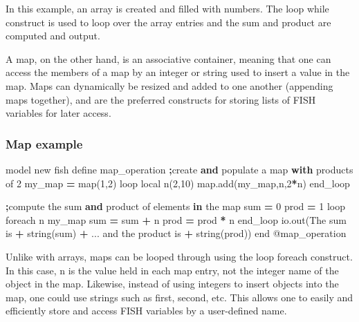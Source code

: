 \documentclass[a4paper, nobind]{templates/ociamthesis}
\newenvironment{Shaded}{\begin{snugshade}}{\end{snugshade}}
\newcommand{\AttributeTok}[1]{\textcolor[rgb]{0.77,0.63,0.00}{#1}}
\newcommand{\BuiltInTok}[1]{#1}
\newcommand{\ControlFlowTok}[1]{\textcolor[rgb]{0.13,0.29,0.53}{\textbf{#1}}}
\newcommand{\DecValTok}[1]{\textcolor[rgb]{0.00,0.00,0.81}{#1}}
\newcommand{\KeywordTok}[1]{\textcolor[rgb]{0.13,0.29,0.53}{\textbf{#1}}}
\newcommand{\NormalTok}[1]{#1}
\newcommand{\OperatorTok}[1]{\textcolor[rgb]{0.81,0.36,0.00}{\textbf{#1}}}
\newcommand{\StringTok}[1]{\textcolor[rgb]{0.31,0.60,0.02}{#1}}
\renewenvironment{Shaded}
{
  \vspace{10pt}%
  \begin{snugshade}%
}{%
  \end{snugshade}%
  \vspace{8pt}%
}
\begin{document}
In this example, an array is created and filled with numbers. The loop while construct is used to loop over the array entries and the sum and product are computed and output.

A map, on the other hand, is an associative container, meaning that one can access the members of a map by an integer or string used to insert a value in the map. Maps can dynamically be resized and added to one another (appending maps together), and are the preferred constructs for storing lists of FISH variables for later access.

\hypertarget{map-example}{%
\subsubsection{Map example}\label{map-example}}

\begin{Shaded}
\begin{Highlighting}[]
\NormalTok{model new}
\NormalTok{fish define map\_operation}
    \OperatorTok{;}\NormalTok{create }\KeywordTok{and}\NormalTok{ populate a }\BuiltInTok{map} \ControlFlowTok{with}\NormalTok{ products of }\DecValTok{2}
\NormalTok{    my\_map }\OperatorTok{=} \BuiltInTok{map}\NormalTok{(}\DecValTok{1}\NormalTok{,}\DecValTok{2}\NormalTok{)}
\NormalTok{    loop local n(}\DecValTok{2}\NormalTok{,}\DecValTok{10}\NormalTok{)}
        \BuiltInTok{map}\NormalTok{.add(my\_map,n,}\DecValTok{2}\OperatorTok{*}\NormalTok{n)}
\NormalTok{    end\_loop}
      
    \OperatorTok{;}\NormalTok{compute the }\BuiltInTok{sum} \KeywordTok{and}\NormalTok{ product of elements }\KeywordTok{in}\NormalTok{ the }\BuiltInTok{map}
    \BuiltInTok{sum} \OperatorTok{=} \DecValTok{0}
\NormalTok{    prod }\OperatorTok{=} \DecValTok{1}
\NormalTok{    loop foreach n my\_map}
        \BuiltInTok{sum} \OperatorTok{=} \BuiltInTok{sum} \OperatorTok{+}\NormalTok{ n}
\NormalTok{        prod }\OperatorTok{=}\NormalTok{ prod }\OperatorTok{*}\NormalTok{ n}
\NormalTok{    end\_loop}
\NormalTok{    io.out(}\StringTok{\textquotesingle{}The sum is \textquotesingle{}} \OperatorTok{+}\NormalTok{ string(}\BuiltInTok{sum}\NormalTok{) }\OperatorTok{+}\NormalTok{ ...}
           \StringTok{\textquotesingle{} and the product is \textquotesingle{}} \OperatorTok{+}\NormalTok{ string(prod))}
\NormalTok{end}
\AttributeTok{@map\_operation}
\end{Highlighting}
\end{Shaded}

Unlike with arrays, maps can be looped through using the loop foreach construct. In this case, n is the value held in each map entry, not the integer name of the object in the map. Likewise, instead of using integers to insert objects into the map, one could use strings such as first, second, etc. This allows one to easily and efficiently store and access FISH variables by a user-defined name.
\end{document}
